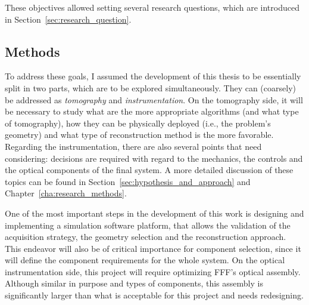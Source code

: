 These objectives allowed setting several research questions, which are
introduced in Section~\ref{sec:research_question}.

\subsection{Methods}%
\label{sub:methods}

To address these goals, I assumed the development of this thesis to be
essentially split in two parts, which are to be explored simultaneously.
They can (coarsely) be addressed as \emph{tomography} and
\emph{instrumentation}. On the tomography side, it will be necessary to
study what are the more appropriate algorithms (and what type of
tomography), how they can be physically deployed (i.e., the problem's
geometry) and what type of reconstruction method is the more favorable.
Regarding the instrumentation, there are also several points that need
considering: decisions are required with regard to the mechanics, the
controls and the optical components of the final system. A more detailed
discussion of these topics can be found in
Section~\ref{sec:hypothesis_and_approach} and
Chapter~\ref{cha:research_methods}.

One of the most important steps in the development of this work is
designing and implementing a simulation software platform, that allows
the validation of the acquisition strategy, the geometry selection and
the reconstruction approach. This endeavor will also be of critical
importance for component selection, since it will define the component
requirements for the whole system. On the optical instrumentation side,
this project will require optimizing \gls{FFF}'s optical assembly.
Although similar in purpose and types of components, this assembly is
significantly larger than what is acceptable for this project and needs
redesigning.




